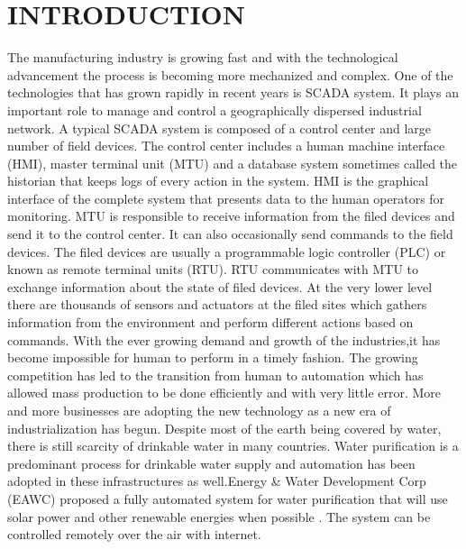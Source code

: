 \documentclass[letterpaper, 10 pt, conference]{ieeeconf}  %
\begin{document}
\section{INTRODUCTION}
The manufacturing industry is growing fast and with the technological advancement the process is becoming more mechanized and complex. One of the technologies that has grown rapidly in recent years is SCADA system. It plays an important role to manage and control a geographically dispersed industrial network. A typical SCADA system is composed of a control center and large number of field devices. The control center includes a human machine interface (HMI), master terminal unit (MTU) and a database system sometimes called the historian that keeps logs of every action in the system. HMI is the graphical interface of the complete system that presents data to the human operators for monitoring. MTU is responsible to receive information from the filed devices and send it to the control center. It can also occasionally send commands to the field devices. The filed devices are usually a programmable logic controller (PLC) or known as remote terminal units (RTU). RTU communicates with MTU to exchange information about the state of filed devices. At the very lower level there are thousands of sensors and actuators at the filed sites which gathers information from the environment and perform different actions based on commands. With the ever growing demand and growth of the industries,it has become impossible for human to perform in a timely fashion. The growing competition has led to the transition from human to automation which has allowed mass production to be done efficiently and with very little error. More and more businesses are adopting the new technology as a new era of industrialization has begun. Despite most of the earth being covered by water, there is still scarcity of drinkable water in many countries. Water purification is a predominant process for drinkable water supply and automation has been adopted in these infrastructures as well.Energy & Water Development Corp (EAWC) proposed a fully automated system for water purification that will use solar power and other renewable energies when possible \cite{c33}. The system can be controlled remotely over the air with internet. 
\end{document}
